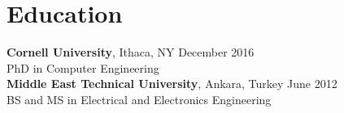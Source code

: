     \section{\mysidestyle \textcolor{olgray}{Education}}
    \textbf{Cornell University}, Ithaca, NY \hfill  December 2016 \vspace{1mm}\\\vspace{0mm}%
    PhD in Computer Engineering  \hfill   \vspace{-5mm} \\%

    \textbf{Middle East Technical University}, Ankara, Turkey  \hfill  June 2012 \vspace{1mm}\\\vspace{0mm}%
    BS and MS in Electrical and Electronics Engineering  \hfill  \vspace{-3mm} \\\vspace{0mm}%
